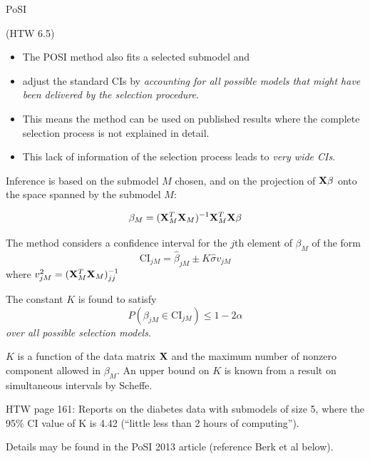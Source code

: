 \documentclass[
  ignorenonframetext,
]{beamer}
\providecommand{\tightlist}{%
  \setlength{\itemsep}{0pt}\setlength{\parskip}{0pt}}
\begin{document}
\begin{frame}

\begin{block}{PoSI}

(HTW 6.5)

\begin{itemize}
\tightlist
\item
  The POSI method also fits a selected submodel and
\item
  adjust the standard CIs by \emph{accounting for all possible models
  that might have been delivered by the selection procedure}.
\item
  This means the method can be used on published results where the
  complete selection process is not explained in detail.
\item
  This lack of information of the selection process leads to \emph{very
  wide CIs}.
\end{itemize}

Inference is based on the submodel \(M\) chosen, and on the projection
of \({\bf X} \beta\) onto the space spanned by the submodel \(M\):

\[\beta_M=({\bf X}_M^T{\bf X}_M)^{-1}{\bf X}_M^T{\bf X} \beta\]

\end{block}

\end{frame}

\begin{frame}

The method considers a confidence interval for the \(j\)th element of
\(\beta_M\) of the form
\[\text{CI}_{jM}=\hat{\beta}_{jM}\pm K \hat{\sigma}v_{jM}\] where
\(v_{jM}^2=({\bf X}_M^T{\bf X}_M)^{-1}_{jj}\)

The constant \(K\) is found to satisfy
\[ P(\beta_{jM}\in \text{CI}_{jM}) \le 1-2\alpha\] \emph{over all
possible selection models}.

\end{frame}

\begin{frame}

\(K\) is a function of the data matrix \({\bf X}\) and the maximum
number of nonzero component allowed in \(\beta_M\). An upper bound on
\(K\) is known from a result on simultaneous intervals by Scheffe.

HTW page 161: Reports on the diabetes data with submodels of size 5,
where the 95\% CI value of K is 4.42 (``little less than 2 hours of
computing'').

Details may be found in the PoSI 2013 article (reference Berk et al
below).

\end{frame}
\end{document}
